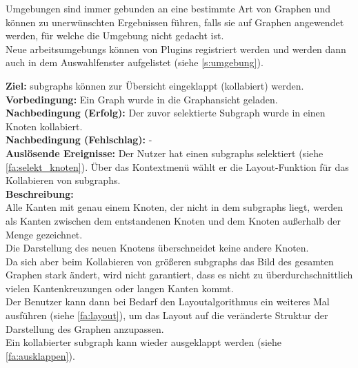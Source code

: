 Umgebungen sind immer gebunden an eine bestimmte Art von Graphen und können zu unerwünschten Ergebnissen führen, falls sie auf Graphen angewendet werden, für welche die Umgebung nicht gedacht ist.\\
Neue \glspl{arbeitsumgebung} können von Plugins registriert werden und werden dann auch in dem Auswahlfenster aufgelistet (siehe \ref{s:umgebung}).


\label{fa:kollabieren}
\textbf{Ziel:} \glspl{subgraph} können zur Übersicht eingeklappt (kollabiert) werden.\\
\textbf{Vorbedingung:} Ein Graph wurde in die Graphansicht geladen.\\
\textbf{Nachbedingung (Erfolg):} Der zuvor selektierte Subgraph wurde in einen Knoten kollabiert.\\
\textbf{Nachbedingung (Fehlschlag):} -\\
\textbf{Auslösende Ereignisse:} Der Nutzer hat einen \glspl{subgraph} selektiert (siehe \ref{fa:selekt_knoten}).
Über das Kontextmenü wählt er die Layout-Funktion für das Kollabieren von \glspl{subgraph}.\\
\textbf{Beschreibung:}\\
Alle Kanten mit genau einem Knoten, der nicht in dem \glspl{subgraph} liegt, werden als Kanten zwischen dem entstandenen Knoten und dem Knoten außerhalb der Menge gezeichnet.\\
Die Darstellung des neuen Knotens überschneidet keine andere Knoten.\\
Da sich aber beim Kollabieren von größeren \glspl{subgraph} das Bild des gesamten Graphen stark ändert, wird nicht garantiert,
dass es nicht zu überdurchschnittlich vielen Kantenkreuzungen oder langen Kanten kommt.\\
Der Benutzer kann dann bei Bedarf den Layoutalgorithmus ein weiteres Mal ausführen (siehe \ref{fa:layout}), um das Layout auf die
veränderte Struktur der Darstellung des Graphen anzupassen.\\
Ein kollabierter \gls{subgraph} kann wieder ausgeklappt werden (siehe \ref{fa:ausklappen}).


